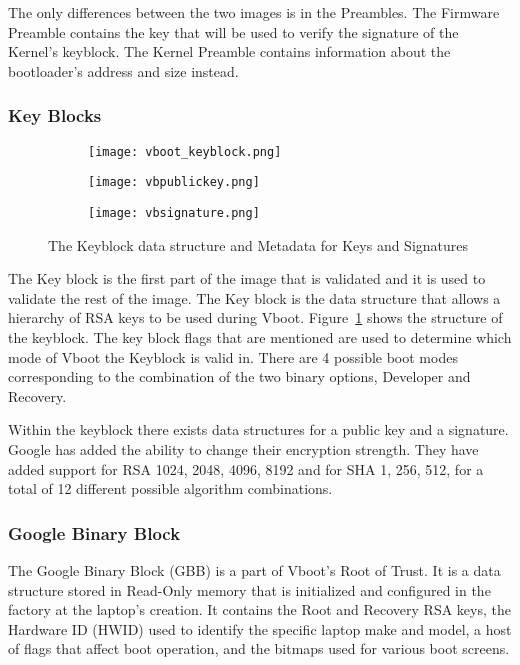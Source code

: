 \documentclass[../report.tex]{subfiles}
\begin{document}
The only differences between the two images is in the Preambles.
The Firmware Preamble contains the key that will be used to verify the signature of the Kernel's keyblock.
The Kernel Preamble contains information about the bootloader's address and size instead.

\subsubsection{Key Blocks}

\begin{figure}
\begin{subfigure}{.5\textwidth}
  \centering
  \texttt{[image: vboot\_keyblock.png]}
\end{subfigure}
\begin{subfigure}{.20\textwidth}
  \centering
  \texttt{[image: vbpublickey.png]}
\end{subfigure}
\begin{subfigure}{.20\textwidth}
  \centering
  \texttt{[image: vbsignature.png]}
\end{subfigure}
\caption{The Keyblock data structure and Metadata for Keys and Signatures}
\label{fig:vboot_keyblock}
\end{figure}

The Key block is the first part of the image that is validated and it is used to validate the rest of the image.
The Key block is the data structure that allows a hierarchy of RSA keys to be used during Vboot.
Figure~\ref{fig:vboot_keyblock} shows the structure of the keyblock. 
The key block flags that are mentioned are used to determine which mode of Vboot the Keyblock is valid in. 
There are 4 possible boot modes corresponding to the combination of the two binary options, Developer and Recovery.

Within the keyblock there exists data structures for a public key and a signature.
Google has added the ability to change their encryption strength.
They have added support for RSA 1024, 2048, 4096, 8192 and for SHA 1, 256, 512, for a total of 12 different possible algorithm combinations.

\subsubsection{Google Binary Block}

The Google Binary Block (GBB) is a part of Vboot's Root of Trust.
It is a data structure stored in Read-Only memory that is initialized and configured in the factory at the laptop's creation.
It contains the Root and Recovery RSA keys, the Hardware ID (HWID) used to identify the specific laptop make and model, a host of flags that affect boot operation, and the bitmaps used for various boot screens.
\end{document}

